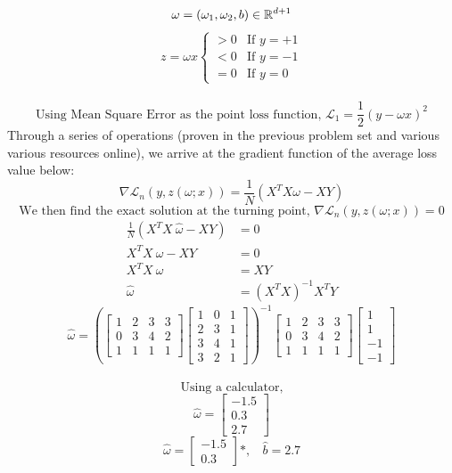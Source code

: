 \documentclass[12pt]{article}
\newenvironment{solution}[2][Solution]{\begin{trivlist}
\item[\hskip \labelsep {\bfseries #1}]}{\end{trivlist}}
\begin{document}
\begin{solution}{}
$$\omega=(\omega_1,\omega_2,b)\in\mathbb R^{d+1}\\$$
$$
z=\omega x \left\{\begin{array}{ll}>0 & \text{If }y=+1\\<0 &\text{If }y=-1\\=0 &\text{If }y=0\end{array}\right.
$$
~\\
$$\text{Using Mean Square Error as the point loss function, }\mathcal L_1=\frac{1}{2}(y-\omega x)^2$$
Through a series of operations (proven in the previous problem set and various various resources online), we arrive at the gradient function of the average loss value below\cite{proof1}:
$$\nabla\mathcal L_n(y,z(\omega;x))=\frac{1}{N}(X^TX\omega-X Y)$$
$$\text{We then find the exact solution at the turning point, }\nabla\mathcal L_n(y,z(\omega;x))=0$$
\begin{align*}
\frac{1}{N}(X^TX\ \hat\omega-X Y) &= 0\\
X^TX\ \hat\omega-X Y&= 0\\
X^TX\ \hat\omega &= X Y \\
\hat\omega &= (X^TX)^{-1}X^TY
\end{align*}
\pagebreak
$$\hat\omega=\left(\left[\begin{matrix}
1&2&3&3\\0&3&4&2\\1&1&1&1
\end{matrix}\right]\left[\begin{matrix}
1&0&1\\2&3&1\\3&4&1\\3&2&1
\end{matrix}\right]\right)^{-1}\left[\begin{matrix}
1&2&3&3\\0&3&4&2\\1&1&1&1
\end{matrix}\right]\left[\begin{matrix}
1\\1\\-1\\-1
\end{matrix}\right]$$
~\\
$$\text{Using a calculator,}$$
$$\hat\omega=\left[\begin{matrix}
-1.5\\0.3\\2.7
\end{matrix}\right]$$
$$\hat\omega=\left[\begin{matrix}
-1.5\\0.3
\end{matrix}\right]*,\ \ \ \ \hat b=2.7$$


\end{solution}
\end{document}
